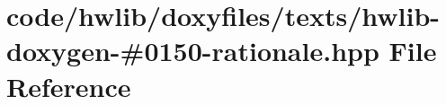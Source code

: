 \hypertarget{hwlib-doxygen-#0150-rationale_8hpp}{}\section{code/hwlib/doxyfiles/texts/hwlib-\/doxygen-\/\#0150-\/rationale.hpp File Reference}
\label{hwlib-doxygen-#0150-rationale_8hpp}
